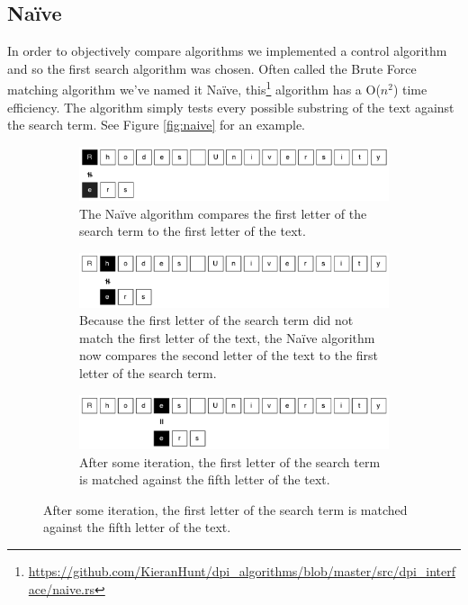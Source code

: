 \documentclass{article}
\begin{document}
\subsection{Na{\"i}ve} \label{sec:naive} \label{sec:naive}
In order to objectively compare algorithms we implemented a control algorithm and so the first \citep{AbuHmed2007} search algorithm was chosen. Often called the Brute Force matching algorithm we've named it Na{\"i}ve, this\footnote{\url{https://github.com/KieranHunt/dpi_algorithms/blob/master/src/dpi_interface/naive.rs}} algorithm has a O(\(n^2\)) time efficiency. The algorithm simply tests every possible substring of the text against the search term. See Figure \ref{fig:naive} for an example.
\begin{figure}[h!bt]
  
  \centering
  
  \begin{subfigure}{\textwidth}
  \makeatletter
  \includegraphics[width=\textwidth]{images/naive-1}
  \caption{The Na{\"i}ve algorithm compares the first letter of the search term to the first letter of the text.}
  \end{subfigure}
  
  \begin{subfigure}{\textwidth}
  \makeatletter
  \includegraphics[width=\textwidth]{images/naive-2}
  \caption{Because the first letter of the search term did not match the first letter of the text, the Na{\"i}ve algorithm now compares the second letter of the text to the first letter of the search term.}
  \end{subfigure}
  
  \begin{subfigure}{\textwidth}
  \makeatletter
  \includegraphics[width=\textwidth]{images/naive-3}
  \caption{After some iteration, the first letter of the search term is matched against the fifth letter of the text.}
  \end{subfigure}
  

\end{figure}
\end{document}
